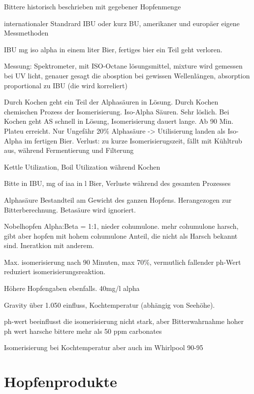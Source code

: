 \documentclass[a4paper,parskip=half]{scrartcl}
\begin{document}
\parencite[120\psq]{Garetz1994}
Bittere historisch beschrieben mit gegebener Hopfenmenge

internationaler Standrard IBU oder kurz BU, amerikaner und
europäer eigene Messmethoden
 
\parencite[121]{Garetz1994} 
IBU mg iso alpha in einem liter Bier, fertiges bier
ein Teil geht verloren. 

Messung: Spektrometer, mit ISO-Octane lösungsmittel, mixture
wird gemessen bei UV licht, genauer gesagt die abosption
bei gewissen Wellenlängen, absorption proportional
zu IBU (die wird korreliert)

\parencite[12]{Garetz1994}
Durch Kochen geht ein Teil der Alphasäuren in Lösung. Durch Kochen
chemischen Prozess der Isomerisierung. Iso-Alpha Säuren. Sehr löslich.
Bei Kochen geht AS schnell in Lösung, Isomerisierung dauert lange.
Ab 90 Min. Plateu erreicht.
Nur Ungefähr 20\% Alphasäure -> Utilisierung landen als Iso-Alpha im
fertigen Bier.
Verlust: zu kurze Isomerisierugszeit, fällt mit Kühltrub aus,
während Fermentierung und Filterung

\parencite[13]{Garetz1994}
Kettle Utilization, Boil Utilization während Kochen

\parencite[14]{Garetz1994} 
Bitte in IBU, mg of iaa in l Bier, Verluste während des gesamten
Prozesses

\parencite[34]{Garetz1994}
Alphasäure Bestandteil am Gewicht des ganzen Hopfens. Herangezogen
zur Bitterberechnung. Betasäure wird ignoriert.

\parencite[35]{Garetz1994}
Nobelhopfen Alpha:Beta = 1:1, nieder cohumulone.
mehr cohumulone harsch, gibt aber hopfen mit hohem cohumulone
Anteil, die nicht als Harsch bekannt sind. Ineratkion
mit anderem.

\parencite[128]{Garetz1994} 
Max. isomerisierung nach 90 Minuten, max 70\%, vermutlich fallender
ph-Wert reduziert isomerisierungsreaktion.

Höhere Hopfengaben ebenfalls. 40mg/l alpha 

\parencite[129]{Garetz1994} 
Gravity über 1.050 einfluss, Kochtemperatur (abhängig von Seehöhe).


\parencite[78]{Daniels1996}
ph-wert beeinflusst die isomerisierung nicht stark, aber Bitterwahrnahme
hoher ph wert harsche bittere mehr als 50 ppm carbonates

\parencite[49]{Holle2010} Isomerisierung bei Kochtemperatur
aber auch im Whirlpool 90-95


\section*{Hopfenprodukte}
\end{document}
